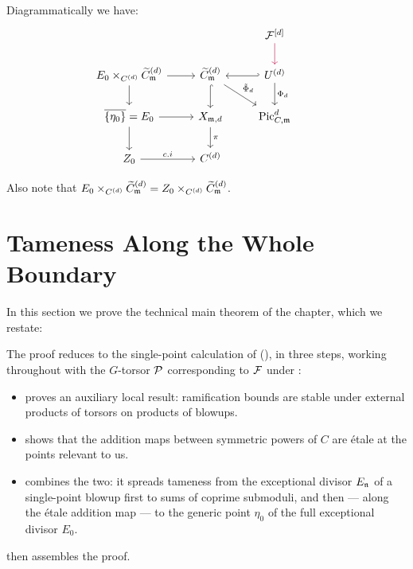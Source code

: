 Diagrammatically we have:
\[
\begin{tikzcd}
    &  & \cF^{[d]} \arrow[d, purple]\\
    E_0 \times_{C^{(d)}} \Cmod{d} \arrow[d] \arrow[r]  & \Cmod{d} \arrow[d, hook] \arrow[rd, "\tilde{\Phi}_d"]  & U^{(d)} \arrow[l, hook'] \arrow[d, "\Phi_d"] \\
\overline{\{\eta_0 \}} =  E_0 \arrow[r] \arrow[d] &
X_{\mdls, d} \arrow[d, "\pi"]  &  \PicCm[d] &  \\
Z_0 \arrow[r, "c.i"]           & C^{(d)}
\end{tikzcd}
\]

Also note that $ E_0 \times_{C^{(d)}} \widetilde{C}_{\mathfrak{m}}^{(d)} = Z_0 \times_{C^{(d)}} \widetilde{C}_{\mathfrak{m}}^{(d)}$.


\section{Tameness Along the Whole Boundary}\label{section:tameness_along_boundary}

In this section we prove the technical main theorem of the chapter, which we
restate:

\SymmetricPowerOfSheafIsTamelyRamified*

The proof reduces  to
the single-point calculation of
(), in three steps, working
throughout with the $G$-torsor $\mathcal{P}$ corresponding to $\mathcal{F}$ under
:
\begin{itemize}
    \item {} proves an auxiliary local
    result: ramification bounds are stable under external products of
    torsors on products of blowups.
    \item {} shows that the addition
    maps between symmetric powers of $C$ are \'etale at the points relevant
    to us.
    \item {} combines the two: it spreads
    tameness from the exceptional divisor $E_{\mathfrak{n}}$ of a single-point blowup
    first to sums of coprime submoduli, and then --- along the \'etale
    addition map --- to the generic point $\eta_0$ of the full exceptional
    divisor $E_0$.
\end{itemize}
 then assembles the proof.


